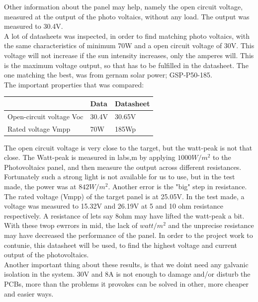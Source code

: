 Other information about the panel may help, namely the open circuit voltage, measured at the output of the photo voltaics, without any load. The output was measured to 30.4V. \\
A lot of datasheets was inspected, in order to find matching photo voltaics, with the same characteristics of minimum 70W and a open circuit voltage of 30V. This voltage will not increase if the sun intensity increases, only the amperes will. This is the maximum voltage output, so that has to be fulfilled in the datasheet. The one matching the best, was from gernam solar power; GSP-P50-185. \hilight{\textbf{[DATASHEET]}} \\
The important properties that was compared:\\

\begin{tabular}{|l|l|l|}
\hline  & Data & Datasheet \\ 
\hline Open-circuit voltage Voc & 30.4V & 30.65V \\ 
\hline Rated voltage Vmpp & 70W & 185Wp \\ 
\hline 
\end{tabular} 

The open circuit voltage is very close to the target, but the watt-peak is not that close. The Watt-peak is measured in labs,m by applying $1000W/m^2$ to the Photovoltaics panel, and then measure the output across different resistances. Fortunately such a strong light is not available for us to use, but in the test made, the power was at $842W/m^2$. Another error is the "big" step in resistance. The rated voltage (Vmpp) of the target panel is at 25.05V. In the test made, a voltage was measured to 15.32V and 26.19V at 5 and 10 ohm resistance respectively. A resistance of lets say 8ohm may have lifted the watt-peak a bit. With these twop ewrrors in mid, the lack of $watt/m^2$ and the unprecise resistance may have decreased the performance of the panel. In order to the project work to contunie, this datasheet will be used, to find the highest voltage and current output of the photovoltaics. \\

Another important thing about these results, is that we doint need any galvanic isolation in the system. 30V and 8A is not enough to damage and/or disturb the PCBs, more than the problems it provokes can be solved in other, more cheaper and easier ways. 







